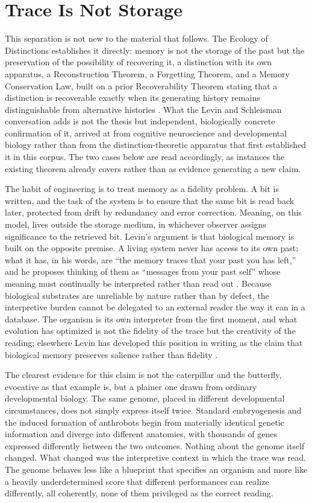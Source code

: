 \documentclass[11pt]{article}
\begin{document}
\section{Trace Is Not Storage}

This separation is not new to the material that follows. The Ecology of Distinctions establishes it directly: memory is not the storage of the past but the preservation of the possibility of recovering it, a distinction with its own apparatus, a Reconstruction Theorem, a Forgetting Theorem, and a Memory Conservation Law, built on a prior Recoverability Theorem stating that a distinction is recoverable exactly when its generating history remains distinguishable from alternative histories \cite{ecologydistinctions}. What the Levin and Schleisman conversation adds is not the thesis but independent, biologically concrete confirmation of it, arrived at from cognitive neuroscience and developmental biology rather than from the distinction-theoretic apparatus that first established it in this corpus. The two cases below are read accordingly, as instances the existing theorem already covers rather than as evidence generating a new claim.

The habit of engineering is to treat memory as a fidelity problem. A bit is written, and the task of the system is to ensure that the same bit is read back later, protected from drift by redundancy and error correction. Meaning, on this model, lives outside the storage medium, in whichever observer assigns significance to the retrieved bit. Levin's argument is that biological memory is built on the opposite premise. A living system never has access to its own past; what it has, in his words, are ``the memory traces that your past you has left,'' and he proposes thinking of them as ``messages from your past self'' whose meaning must continually be interpreted rather than read out \cite{levinschleisman2026}. Because biological substrates are unreliable by nature rather than by defect, the interpretive burden cannot be delegated to an external reader the way it can in a database. The organism is its own interpreter from the first moment, and what evolution has optimized is not the fidelity of the trace but the creativity of the reading; elsewhere Levin has developed this position in writing as the claim that biological memory preserves salience rather than fidelity \cite{levin2024entropy}.

The clearest evidence for this claim is not the caterpillar and the butterfly, evocative as that example is, but a plainer one drawn from ordinary developmental biology. The same genome, placed in different developmental circumstances, does not simply express itself twice. Standard embryogenesis and the induced formation of anthrobots begin from materially identical genetic information and diverge into different anatomies, with thousands of genes expressed differently between the two outcomes. Nothing about the genome itself changed. What changed was the interpretive context in which the trace was read. The genome behaves less like a blueprint that specifies an organism and more like a heavily underdetermined score that different performances can realize differently, all coherently, none of them privileged as the correct reading.
\end{document}
